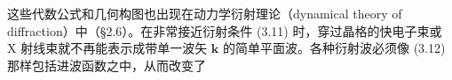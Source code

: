 

这些代数公式和几何构图也出现在动力学衍射理论（dynamical theory of diffraction）中（§2.6）。在非常接近衍射条件 (3.11) 时，穿过晶格的快电子束或 X 射线束就不再能表示成带单一波矢 $\mathbf{k}$ 的简单平面波。各种衍射波必须像 (3.12) 那样包括进波函数之中，从而改变了


